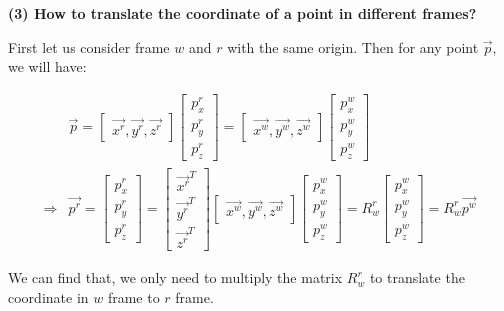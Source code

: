 \documentclass[
]{book}
\theoremstyle{definition}
\theoremstyle{definition}
\theoremstyle{definition}
\theoremstyle{definition}
\theoremstyle{remark}
\begin{document}
\textbf{(3) How to translate the coordinate of a point in different frames?}

First let us consider frame \(w\) and \(r\) with the same origin. Then for any point \(\vec{p}\), we will have:

\begin{align}
    &\vec{p} = \begin{bmatrix} \vec{x^r},\vec{y^r},\vec{z^r}\end{bmatrix} \begin{bmatrix} p^r_x\\p^r_y\\p^r_z \end{bmatrix} = \begin{bmatrix} \vec{x^w},\vec{y^w},\vec{z^w}\end{bmatrix} \begin{bmatrix} p^w_x\\p^w_y\\p^w_z \end{bmatrix} \\
    \Rightarrow& \vec{p^r} = \begin{bmatrix} p^r_x\\p^r_y\\p^r_z \end{bmatrix} = \begin{bmatrix} \vec{x^r}^T\\ \vec{y^r}^T\\ \vec{z^r}^T\end{bmatrix} \begin{bmatrix} \vec{x^w},\vec{y^w},\vec{z^w}\end{bmatrix} \begin{bmatrix} p^w_x\\p^w_y\\p^w_z \end{bmatrix} = R^r_w \begin{bmatrix} p^w_x\\p^w_y\\p^w_z \end{bmatrix} = R^r_w\vec{p^w} 
\end{align}

We can find that, we only need to multiply the matrix \(R^r_w\) to translate the coordinate in \(w\) frame to \(r\) frame.
\end{document}
